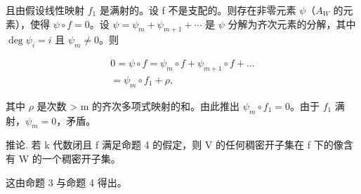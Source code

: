 且由假设线性映射 \(f_{1}\) 是满射的。设 f 不是支配的。则存在非零元素 \(\psi\)（\(A_{W}\) 的元素），使得 \(\psi \circ f = 0\)。设 \(\psi = \psi_{m} + \psi_{m+1} + \cdots\) 是 \(\psi\) 分解为齐次元素的分解，其中 \(\deg \psi_{i} = i\) 且 \(\psi_{m} \neq 0\)。则

\[
\begin{array}{l} 0 = \psi \circ f = \psi_ {m} \circ f + \psi_ {m + 1} \circ f + \dots \\ = \psi_ {m} \circ f _ {1} + \rho , \end{array}
\]

其中 \(\rho\) 是次数 \textgreater{} m 的齐次多项式映射的和。由此推出 \(\psi_{m} \circ f_{1} = 0\)。由于 \(f_{1}\) 满射，\(\psi_{m} = 0\)，矛盾。

推论. 若 k 代数闭且 f 满足命题 4 的假定，则 V 的任何稠密开子集在 f 下的像含有 W 的一个稠密开子集。

这由命题 3 与命题 4 得出。
\relax{}

